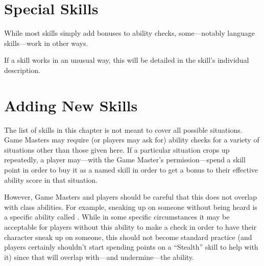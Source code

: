\begin{multicols*}{2}
\section{Special Skills}
While most skills simply add bonuses to ability checks, some—notably language skills—work in other ways.

If a skill works in an unusual way, this will be detailed in the skill’s individual description.

\section{Adding New Skills}
The list of skills in this chapter is not meant to cover all possible situations. Game Masters may require (or players may ask for) ability checks for a variety of situations other than those given here. If a particular situation crops up repeatedly, a player may—with the Game Master’s permission—spend a skill point in order to buy it as a named skill in order to get a bonus to their effective ability score in that situation.

However, Game Masters and players should be careful that this does not overlap with class abilities. For example, sneaking up on someone without being heard is a specific  ability called . While in some specific circumstances it may be acceptable for players without this ability to make a  check in order to have their character sneak up on someone, this should not become standard practice (and players certainly shouldn’t start spending points on a “Stealth” skill to help with it) since that will overlap with—and undermine—the  ability.


\end{multicols*}
